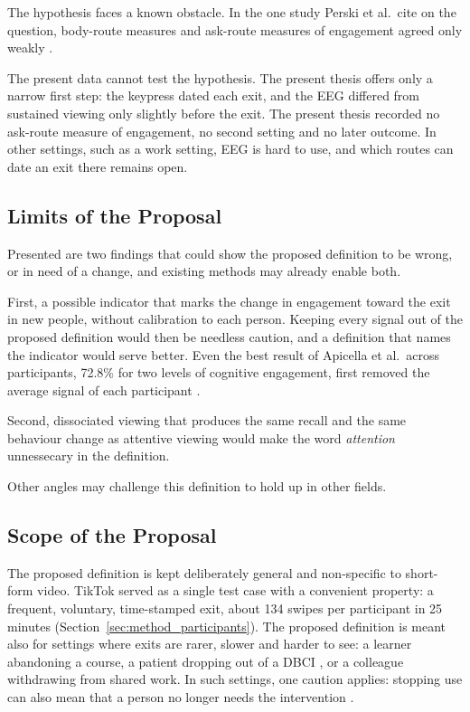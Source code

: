 \documentclass[12pt,a4paper]{report}
\begin{document}
The hypothesis faces a known obstacle. In the one study Perski et al.\ cite on the question, body-route measures and ask-route measures of engagement agreed only weakly \cite{perski_conceptualising_2017}.

The present data cannot test the hypothesis. The present thesis offers only a narrow first step: the keypress dated each exit, and the EEG differed from sustained viewing only slightly before the exit. The present thesis recorded no ask-route measure of engagement, no second setting and no later outcome. In other settings, such as a work setting, EEG is hard to use, and which routes can date an exit there remains open.

\subsection{Limits of the Proposal}
\label{sec:engagement_falsification}

Presented are two findings that could show the proposed definition to be wrong, or in need of a change, and existing methods may already enable both.

First, a possible indicator that marks the change in engagement toward the exit in new people, without calibration to each person. Keeping every signal out of the proposed definition would then be needless caution, and a definition that names the indicator would serve better. Even the best result of Apicella et al.\ across participants, 72.8\% for two levels of cognitive engagement, first removed the average signal of each participant \cite{apicella_eeg-based_2022}.

Second, dissociated viewing that produces the same recall and the same behaviour change as attentive viewing would make the word \emph{attention} unnessecary in the definition.

Other angles may challenge this definition to hold up in other fields.

\subsection{Scope of the Proposal}
\label{sec:engagement_scope}

The proposed definition is kept deliberately general and non-specific to short-form video. TikTok served as a single test case with a convenient property: a frequent, voluntary, time-stamped exit, about 134 swipes per participant in 25 minutes (Section~\ref{sec:method_participants}). The proposed definition is meant also for settings where exits are rarer, slower and harder to see: a learner abandoning a course, a patient dropping out of a DBCI \cite{perski_conceptualising_2017}, or a colleague withdrawing from shared work. In such settings, one caution applies: stopping use can also mean that a person no longer needs the intervention \cite{yardley_understanding_2016}.
\end{document}
